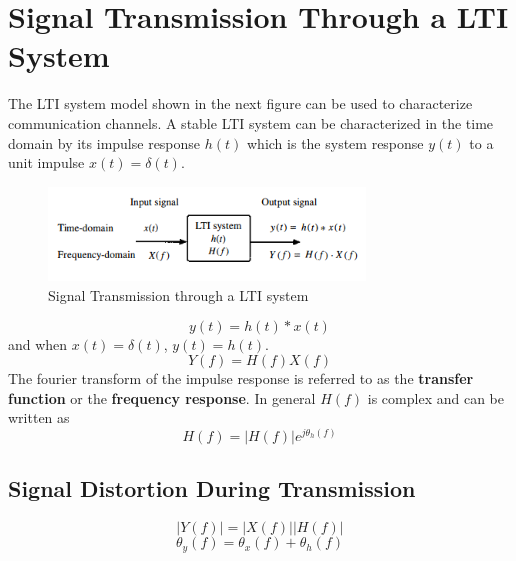 \documentclass{article}
\begin{document}
    \section{Signal Transmission Through a LTI System}
    The LTI system model shown in the next figure can be used to characterize communication channels. A stable LTI system can be characterized in 
    the time domain by its impulse response $h(t)$ which is the system response $y(t)$ to a unit impulse $x(t) = \delta(t)$.

    \begin{figure}[h]
        \centering
        \includegraphics[width=0.75\textwidth]{lti}
        \caption{Signal Transmission through a LTI system}
    \end{figure}

    \begin{equation}
        y(t) = h(t) \ast x(t)
    \end{equation}
    and when $x(t) = \delta(t)$, $y(t) = h(t)$.
    \begin{equation}
        Y(f) = H(f)X(f)
    \end{equation}
    The fourier transform of the impulse response is referred to as the \textbf{transfer function} or the \textbf{frequency response}. In general $H(f)$ is 
    complex and can be written as 
    \begin{equation}
        H(f) = |H(f)|e^{j\theta_h(f)}
    \end{equation}

    \subsection{Signal Distortion During Transmission}
    \begin{equation}
        |Y(f)| = |X(f)||H(f)|
    \end{equation}
    \begin{equation}
        \theta_y(f) = \theta_x(f) + \theta_h(f)
    \end{equation}
\end{document}
